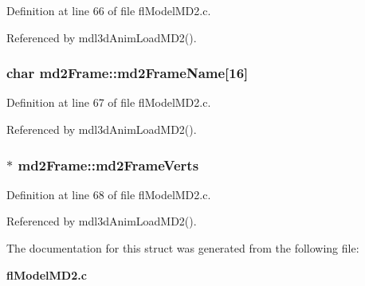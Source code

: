 Definition at line 66 of file fl\-Model\-MD2.c.

Referenced by mdl3d\-Anim\-Load\-MD2().
\subsubsection{\setlength{\rightskip}{0pt plus 5cm}char {\bf md2Frame::md2Frame\-Name}[16]}\label{structmd2Frame_9c6ae978fdab67471b4541992f1e4664}




Definition at line 67 of file fl\-Model\-MD2.c.

Referenced by mdl3d\-Anim\-Load\-MD2().
\subsubsection{$\ast$ {\bf md2Frame::md2Frame\-Verts}}\label{structmd2Frame_39265296662b9ac977f63cef9315f3aa}




Definition at line 68 of file fl\-Model\-MD2.c.

Referenced by mdl3d\-Anim\-Load\-MD2().

The documentation for this struct was generated from the following file:\begin{CompactItemize}
\item 
{\bf fl\-Model\-MD2.c}\end{CompactItemize}
